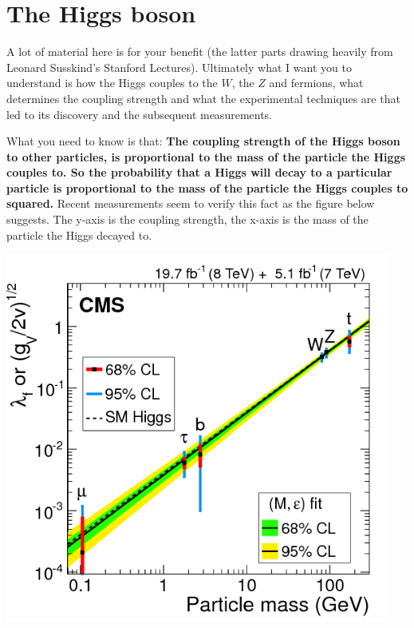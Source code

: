 \section{The Higgs boson}
 
A lot of material here is for your benefit (the latter parts drawing heavily from Leonard Susskind's Stanford Lectures). Ultimately what I want you to understand is how the Higgs couples to the $W$, the $Z$ and fermions, what determines the coupling strength and what the experimental techniques are that led to its discovery and the subsequent measurements.

What you need to know is that:
{\bf The coupling strength of the Higgs boson to other particles, is proportional to the mass of the particle the Higgs couples to. So the probability that a Higgs will decay to a particular particle is proportional to the mass of the particle the Higgs couples to squared.}
Recent measurements seem to verify this fact as the figure below suggests. The y-axis is the coupling strength, the x-axis is the mass of the particle the Higgs decayed to.
\begin{center}
\includegraphics[width=0.95\textwidth]{fig/higgs/cms_higgs_couplings.png}
\end{center}


